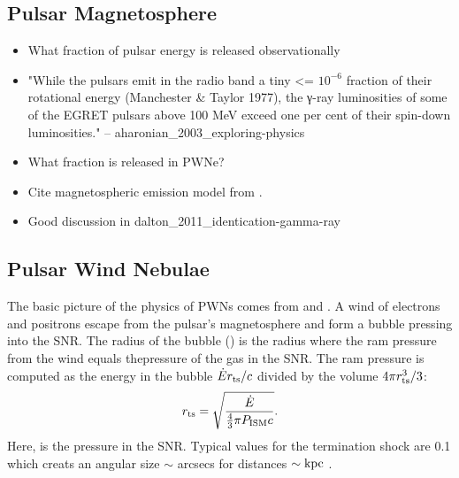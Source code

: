 \subsection{Pulsar Magnetosphere}

\begin{itemize}
  \item What fraction of pulsar energy is released observationally
\item "While the pulsars emit in the radio band a tiny <= $10^{-6}$
fraction of their rotational energy (Manchester \& Taylor 1977), the
γ-ray luminosities of some of the EGRET pulsars above 100 MeV exceed
one per cent of their spin-down luminosities." -- aharonian\_2003\_exploring-physics
  \item What fraction is released in PWNe?
\item Cite magnetospheric emission model from \cite{gold_1968_rotating-neutron}.
  \item Good discussion in dalton\_2011\_identication-gamma-ray
\end{itemize}

\subsection{Pulsar Wind Nebulae}

The basic picture of 
the physics of \acp{PWN} comes from \cite{rees_1974_origin-magnetic}
and \cite{kennel_1984_magnetohydrodynamic-model}.
A wind of electrons and positrons escape from the pulsar's
magnetosphere and form a bubble pressing into 
the \ac{SNR}. The radius of the bubble (\radiusterminationshock)
is the radius where the ram pressure from the wind
equals thepressure of the gas in the \ac{SNR}.
The ram pressure is computed as the energy in the
bubble $\dot{E} r_\text{ts}/c$
divided by the volume $4\pi r_\text{ts}^3/3$:
\begin{equation}
  r_\text{ts} = \sqrt{\frac{\dot{E}}{\tfrac{4}{3}\pi P_\text{ISM} c}}.
\end{equation}
Here, \pressureISM is the pressure in the SNR.
Typical values for the termination shock are 0.1\unitspace\parsec
which creats an angular size $\sim$ \acp{arcsec} for distances $\sim\text{kpc}$
\citep{gaensler_2006_evolution-structure}.





